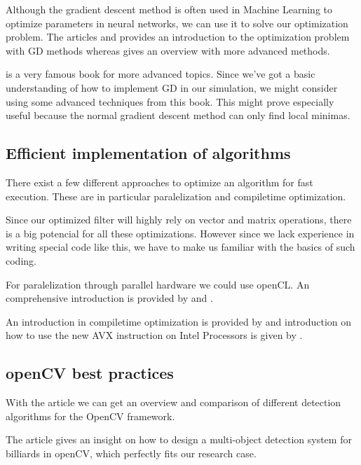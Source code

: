 \documentclass[titlepage, a4paper, 11pt]{scrartcl}
\begin{document}
Although the gradient descent method is often used in Machine Learning to optimize parameters in neural networks, we can use it to solve our optimization problem.
The articles \citep{ketkar2017deep} and \citep{marti2005stochastic} provides an introduction to the optimization problem with GD methods whereas \citep{marti2005stochastic} gives an overview with more advanced methods.

\citep{bishop2006pattern} is a very famous book for more advanced topics. Since we've got a basic understanding of how to implement GD in our simulation, we might consider using 
some advanced techniques from this book. This might prove especially useful because the normal gradient descent method can only find local minimas.

\subsection{Efficient implementation  of  algorithms}

There exist a few different approaches to optimize an algorithm for fast execution. These are in particular paralelization and compiletime optimization.

Since our optimized filter will highly rely on vector and matrix operations, there is a big potencial for all these optimizations. However since we lack experience in
writing special code like this, we have to make us familiar with the basics of such coding.

For paralelization through parallel hardware we could use openCL. An comprehensive introduction is provided by \citep{trevett2013opencl} and \citep{tompson2012introduction}.

An introduction in compiletime optimization is provided by \citep{hohenauer2006retargetable} and introduction on how to use the new AVX instruction on Intel Processors is given by \citep{cornea2015intel}.


\subsection{openCV best practices}

With the article \citep{janku2016comparison} we can get an overview and comparison of different detection algorithms for the OpenCV framework.

The article \citep{gao2018design} gives an insight on how to design a multi-object detection system for billiards in openCV, which perfectly fits our research case.
\end{document}
